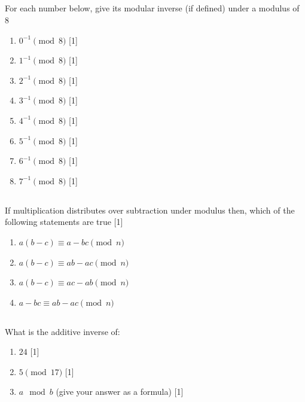 \documentclass[twocolumn]{article}
\newcounter{pmarks}
\newcounter{marks}
\newcommand\mrk[1]{{\hfill\color{blue}\small[{#1}]}\addtocounter{pmarks}{#1}\addtocounter{marks}{#1}}
\begin{document}
\subsection{}

    For each number below, give its modular inverse (if defined) under a modulus of 8

    \begin{multicols}{2}
    \begin{enumerate}
        \item $ 0^{-1} \pmod{8} $ \mrk{1}
        \item $ 1^{-1} \pmod{8} $ \mrk{1}
        \item $ 2^{-1} \pmod{8} $ \mrk{1}
        \item $ 3^{-1} \pmod{8} $ \mrk{1}
        \item $ 4^{-1} \pmod{8} $ \mrk{1}
        \item $ 5^{-1} \pmod{8} $ \mrk{1}
        \item $ 6^{-1} \pmod{8} $ \mrk{1}
        \item $ 7^{-1} \pmod{8} $ \mrk{1}
    \end{enumerate}
\end{multicols}

\subsection{}

    If multiplication distributes over subtraction under modulus then, which of the following statements are true \mrk{1}

    \begin{enumerate}
        \item $a ( b - c ) \equiv a - bc \pmod{n} $
        \item $a ( b - c ) \equiv ab - ac \pmod{n} $
        \item $a ( b - c ) \equiv ac - ab \pmod{n} $
        \item $a - bc \equiv ab - ac \pmod{n} $
    \end{enumerate}

\subsection{}

    What is the additive inverse of:

    \begin{enumerate}
        \item $24$ \mrk{1}
        \item $5 \pmod{17}$ \mrk{1}
        \item $a \mod b$ (give your answer as a formula) \mrk{1}
    \end{enumerate}
\end{document}
